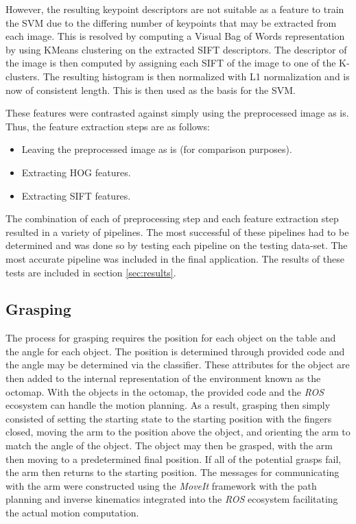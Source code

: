 \documentclass[letterpaper, 10 pt, conference]{conf/ieeeconf}  %
\begin{document}
However, the resulting keypoint descriptors are not suitable as a feature to
train the SVM due to the differing number of keypoints that may be extracted
from each image. This is resolved by computing a Visual Bag of Words representation
by using KMeans clustering on the extracted SIFT descriptors. The descriptor of
the image is then computed by assigning each SIFT of the image to one of the
K-clusters. The resulting histogram is then normalized with L1 normalization and
is now of consistent length. This is then used as the basis for the SVM.

These features were contrasted against simply using the preprocessed image as
is. Thus, the feature extraction steps are as follows:
\begin{itemize}
\item Leaving the preprocessed image as is (for comparison purposes).
\item Extracting HOG features.
\item Extracting SIFT features.
\end{itemize}

The combination of each of preprocessing step and each feature extraction step
resulted in a variety of pipelines. The most successful of these pipelines had
to be determined and was done so by testing each pipeline on the testing
data-set. The most accurate pipeline was included in the final application. The
results of these tests are included in section \ref{sec:results}.

\subsection{Grasping} %
The process for grasping requires the position for each object on the table and
the angle for each object. The position is determined through provided code and
the angle may be determined via the classifier. These attributes for the object
are then added to the internal representation of the environment known as the
octomap. With the objects in the octomap, the provided code and the \textit{ROS}
ecosystem can handle the motion planning. As a result, grasping then simply
consisted of setting the starting state to the starting position with the
fingers closed, moving the arm to the position above the object, and orienting
the arm to match the angle of the object. The object may then be grasped, with
the arm then moving to a predetermined final position. If all of the potential
grasps fail, the arm then returns to the starting position. The messages for
communicating with the arm were constructed using the \textit{MoveIt} framework
with the path planning and inverse kinematics integrated into the \textit{ROS}
ecosystem facilitating the actual motion computation.
\end{document}
